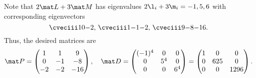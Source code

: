 \begin{solution}
    Note that $2\mat L + 3\mat M$ has eigenvalues $2\l_i + 3\m_i = -1, 5, 6$ with corresponding eigenvectors \[\cveciii10{-2}, \, \cveciii1{-1}{-2}, \, \cveciii9{-8}{-16}.\] Thus, the desired matrices are \[\mat P = \begin{pmatrix}1 & 1 & 9 \\ 0 & -1 & -8 \\ -2 & -2 & -16\end{pmatrix}, \quad \mat D = \begin{pmatrix}(-1)^4 & 0 & 0 \\ 0 & 5^4 & 0 \\ 0 & 0 & 6^4\end{pmatrix} = \begin{pmatrix}1 & 0 & 0 \\ 0 & 625 & 0 \\ 0 & 0 & 1296\end{pmatrix}.\]
\end{solution}

